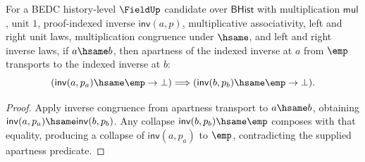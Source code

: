 \begin{theorem}
\label{thm:field-inverse-apart-empty-hsame-transport}
For a BEDC history-level $\FieldUp$ candidate over $\mathsf{BHist}$ with
multiplication $\mathsf{mul}$, unit $1$, proof-indexed inverse
$\mathsf{inv}(a,p)$, multiplicative associativity, left and right unit laws,
multiplication congruence under $\hsame$, and left and right inverse laws, if
$a\hsame b$, then apartness of the indexed inverse at $a$ from $\emp$
transports to the indexed inverse at $b$:
$$
(\mathsf{inv}(a,p_a)\hsame\emp\to\bot)
\Longrightarrow
(\mathsf{inv}(b,p_b)\hsame\emp\to\bot).
$$
\end{theorem}
\begin{proof}
Apply inverse congruence from apartness transport to $a\hsame b$, obtaining
$\mathsf{inv}(a,p_a)\hsame\mathsf{inv}(b,p_b)$. Any collapse
$\mathsf{inv}(b,p_b)\hsame\emp$ composes with that equality, producing a
collapse of $\mathsf{inv}(a,p_a)$ to $\emp$, contradicting the supplied
apartness predicate.
\end{proof}
